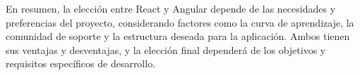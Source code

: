 En resumen, la elección entre React y Angular depende de las necesidades y preferencias del proyecto, considerando factores como la curva de aprendizaje, la comunidad de soporte y la estructura deseada para la aplicación. Ambos tienen sus ventajas y desventajas, y la elección final dependerá de los objetivos y requisitos específicos de desarrollo.

\endinput
-